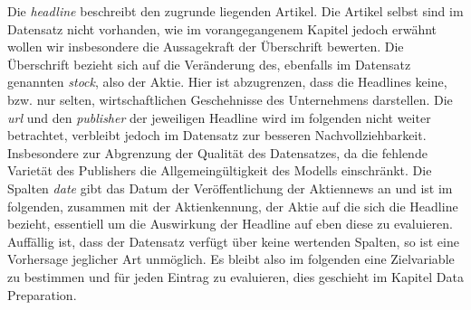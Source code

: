 Die \textit{headline} beschreibt den zugrunde liegenden Artikel. Die Artikel selbst sind im Datensatz nicht vorhanden, wie im vorangegangenem Kapitel jedoch erwähnt wollen wir insbesondere die Aussagekraft der Überschrift bewerten. Die Überschrift bezieht sich auf die Veränderung des, ebenfalls im Datensatz genannten \textit{stock}, also der Aktie. Hier ist abzugrenzen, dass die Headlines keine, bzw. nur selten, wirtschaftlichen Geschehnisse des Unternehmens darstellen.
Die \textit{url} und den \textit{publisher} der jeweiligen Headline wird im folgenden nicht weiter betrachtet, verbleibt jedoch im Datensatz zur besseren Nachvollziehbarkeit. Insbesondere zur Abgrenzung der Qualität des Datensatzes, da die fehlende Varietät des Publishers die Allgemeingültigkeit des Modells einschränkt. Die Spalten \textit{date} gibt das Datum der Veröffentlichung der Aktiennews an und ist im folgenden, zusammen mit der Aktienkennung, der Aktie auf die sich die Headline bezieht, essentiell um die Auswirkung der Headline auf eben diese zu evaluieren.\\
Auffällig ist, dass der Datensatz verfügt über keine wertenden Spalten, so ist eine Vorhersage jeglicher Art unmöglich. Es bleibt also im folgenden eine Zielvariable zu bestimmen und für jeden Eintrag zu evaluieren, dies geschieht im Kapitel Data Preparation.

